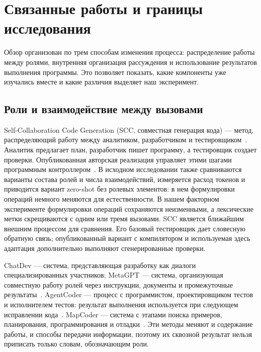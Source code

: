 \section{Связанные работы и границы исследования}\label{sec:related}
Обзор организован по трем способам изменения процесса: распределение работы между ролями, внутренняя организация рассуждения и использование результатов выполнения программы. Это позволяет показать, какие компоненты уже изучались вместе и какие различия выделяет наш эксперимент.

\subsection{Роли и взаимодействие между вызовами}
Self-Collaboration Code Generation (SCC, совместная генерация кода) --- метод, распределяющий работу между аналитиком, разработчиком и тестировщиком~\cite{dong2023selfcollaboration}. Аналитик предлагает план, разработчик пишет программу, а тестировщик создает проверки. Опубликованная авторская реализация управляет этими шагами программным контроллером~\cite{scc2024source}. В исходном исследовании также сравниваются варианты состава ролей и числа взаимодействий, измеряется расход токенов и приводится вариант zero-shot без ролевых элементов: в нем формулировки операций немного меняются для естественности. В нашем факторном эксперименте формулировки операций сохраняются неизменными, а лексические метки скрещиваются с одним или тремя вызовами. SCC является ближайшим внешним процессом для сравнения. Его базовый тестировщик дает словесную обратную связь; опубликованный вариант с компилятором и используемая здесь адаптация дополнительно выполняют сгенерированные проверки.

ChatDev --- система, представляющая разработку как диалоги специализированных участников; MetaGPT --- система, организующая совместную работу ролей через инструкции, документы и промежуточные результаты~\cite{qian2024chatdev,hong2024metagpt}. AgentCoder --- процесс с программистом, проектировщиком тестов и исполнителем тестов: результат выполнения используется при следующем исправлении кода~\cite{huang2023agentcoder}. MapCoder --- система с этапами поиска примеров, планирования, программирования и отладки~\cite{islam2024mapcoder}. Эти методы меняют и содержание работы, и способы передачи информации, поэтому их сквозной результат нельзя приписать только словам, обозначающим роли.

